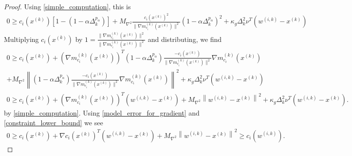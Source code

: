 \documentclass{article}
\theoremstyle{case}
\numberwithin{theorem}{subsection}
\newcommand{\dk}{\Delta_k}
\newcommand{\gmcik}{{\nabla m_{c_i}^{(k)}\left(\xk\right)}}
\newcommand{\maxhessian}{{M_{\nabla^2}}}
\newcommand{\wik}{{w^{(i, k)}}}
\newcommand{\xk}{x^{(k)}}
\begin{document}
\begin{proof}
Using \cref{simple_computation}, this is
\begin{align*}
0 \ge c_i(\xk)\left[1 - \left(1 - \alpha \dk^{p_{\alpha}}\right)\right] + \maxhessian \frac {c_i(\xk)^2}{\|\gmcik\|^2}\left(1 - \alpha \dk^{p_{\alpha}}\right)^2 + \kappa_g \dk^2\nu^T \left(\wik - \xk\right)
\end{align*}
Multiplying $c_i(\xk)$ by $1 = \frac{\|\gmcik\|^2}{\|\gmcik\|^2}$ and distributing, we find
\begin{align*}
0 \ge c_i(\xk) + \left(\gmcik\right)^T\left(1 - \alpha \dk^{p_{\alpha}}\right)\frac{-c_i(\xk)}{\|\gmcik\|^2}\gmcik  \\
+ \maxhessian \left\|\left(1 - \alpha \dk^{p_{\alpha}}\right)\frac{-c_i(\xk)}{\|\gmcik\|^2}\gmcik\right\|^2
+ \kappa_g \dk^2\nu^T \left(\wik - \xk\right) \\
0 \ge c_i(\xk) + \left(\gmcik\right)^T\left(\wik - \xk\right)+ \maxhessian \left\|\wik - \xk\right\|^2  + \kappa_g \dk^2\nu^T \left(\wik - \xk\right).
\end{align*}
by \cref{simple_computation}.
Using \cref{model_error_for_gradient} and \cref{constraint_lower_bound} we see
\begin{align}
0 \ge c_i(\xk) + \nabla c_i(\xk)^T\left(\wik - \xk \right) + \maxhessian \left\|\wik - \xk\right\|^2 \ge c_i(\wik). \label{c_is_negative}
\end{align}


\end{proof}
\end{document}
